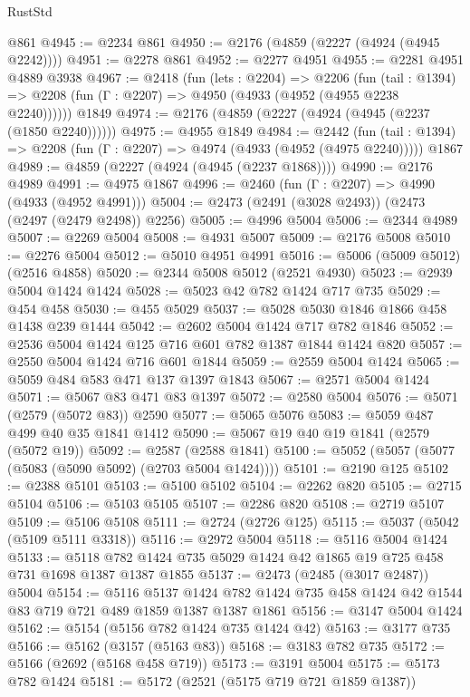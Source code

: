\begin{lexlean}{RustStd}
\begin{coremodule}
{\begin{coremodule}
{{{{{{{{{{    @861
@4945 := @2234 @861
@4950 := @2176 (@4859 (@2227 (@4924 (@4945 @2242))))
@4951 := @2278 @861
@4952 := @2277 @4951
@4955 := @2281 @4951 @4889 @3938
@4967 := @2418
    (fun (lets : @2204) =>
    @2206
      (fun (tail : @1394) => @2208 (fun (Γ : @2207) => @4950 (@4933 (@4952 (@4955 @2238 @2240))))))
    @1849
@4974 := @2176 (@4859 (@2227 (@4924 (@4945 (@2237 (@1850 @2240))))))
@4975 := @4955 @1849
@4984 := @2442
    (fun (tail : @1394) => @2208 (fun (Γ : @2207) => @4974 (@4933 (@4952 (@4975 @2240)))))
    @1867
@4989 := @4859 (@2227 (@4924 (@4945 (@2237 @1868))))
@4990 := @2176 @4989
@4991 := @4975 @1867
@4996 := @2460 (fun (Γ : @2207) => @4990 (@4933 (@4952 @4991)))
@5004 := @2473 (@2491 (@3028 @2493)) (@2473 (@2497 (@2479 @2498)) @2256)
@5005 := @4996 @5004
@5006 := @2344 @4989
@5007 := @2269 @5004
@5008 := @4931 @5007
@5009 := @2176 @5008
@5010 := @2276 @5004
@5012 := @5010 @4951 @4991
@5016 := @5006 (@5009 @5012) (@2516 @4858)
@5020 := @2344 @5008 @5012 (@2521 @4930)
@5023 := @2939 @5004 @1424 @1424
@5028 := @5023 @42 @782 @1424 @717 @735
@5029 := @454 @458
@5030 := @455 @5029
@5037 := @5028 @5030 @1846 @1866 @458 @1438 @239 @1444
@5042 := @2602 @5004 @1424 @717 @782 @1846
@5052 := @2536 @5004 @1424 @125 @716 @601 @782 @1387 @1844 @1424 @820
@5057 := @2550 @5004 @1424 @716 @601 @1844
@5059 := @2559 @5004 @1424
@5065 := @5059 @484 @583 @471 @137 @1397 @1843
@5067 := @2571 @5004 @1424
@5071 := @5067 @83 @471 @83 @1397
@5072 := @2580 @5004
@5076 := @5071 (@2579 (@5072 @83)) @2590
@5077 := @5065 @5076
@5083 := @5059 @487 @499 @40 @35 @1841 @1412
@5090 := @5067 @19 @40 @19 @1841 (@2579 (@5072 @19))
@5092 := @2587 (@2588 @1841)
@5100 := @5052 (@5057 (@5077 (@5083 (@5090 @5092) (@2703 @5004 @1424))))
@5101 := @2190 @125
@5102 := @2388 @5101
@5103 := @5100 @5102
@5104 := @2262 @820
@5105 := @2715 @5104
@5106 := @5103 @5105
@5107 := @2286 @820
@5108 := @2719 @5107
@5109 := @5106 @5108
@5111 := @2724 (@2726 @125)
@5115 := @5037 (@5042 (@5109 @5111 @3318))
@5116 := @2972 @5004
@5118 := @5116 @5004 @1424
@5133 := @5118 @782 @1424 @735 @5029 @1424 @42 @1865 @19 @725 @458 @731 @1698 @1387 @1387 @1855
@5137 := @2473 (@2485 (@3017 @2487)) @5004
@5154 := @5116
    @5137
    @1424
    @782
    @1424
    @735
    @458
    @1424
    @42
    @1544
    @83
    @719
    @721
    @489
    @1859
    @1387
    @1387
    @1861
@5156 := @3147 @5004 @1424
@5162 := @5154 (@5156 @782 @1424 @735 @1424 @42)
@5163 := @3177 @735
@5166 := @5162 (@3157 (@5163 @83))
@5168 := @3183 @782 @735
@5172 := @5166 (@2692 (@5168 @458 @719))
@5173 := @3191 @5004
@5175 := @5173 @782 @1424
@5181 := @5172 (@2521 (@5175 @719 @721 @1859 @1387))
}}}}}}}}}}
\end{coremodule}}
\end{coremodule}
\end{lexlean}
